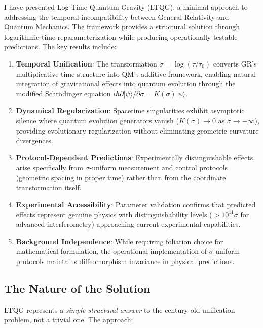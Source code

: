 \documentclass[12pt,a4paper]{article}
\begin{document}
I have presented Log-Time Quantum Gravity (LTQG), a minimal approach to addressing the temporal incompatibility between General Relativity and Quantum Mechanics. The framework provides a structural solution through logarithmic time reparameterization while producing operationally testable predictions. The key results include:

\begin{enumerate}
\item \textbf{Temporal Unification}: The transformation $\sigma = \log(\tau/\tau_0)$ converts GR's multiplicative time structure into QM's additive framework, enabling natural integration of gravitational effects into quantum evolution through the modified Schrödinger equation $i\hbar \partial|\psi\rangle/\partial\sigma = K(\sigma)|\psi\rangle$.

\item \textbf{Dynamical Regularization}: Spacetime singularities exhibit asymptotic silence where quantum evolution generators vanish ($K(\sigma) \to 0$ as $\sigma \to -\infty$), providing evolutionary regularization without eliminating geometric curvature divergences.

\item \textbf{Protocol-Dependent Predictions}: Experimentally distinguishable effects arise specifically from $\sigma$-uniform measurement and control protocols (geometric spacing in proper time) rather than from the coordinate transformation itself.

\item \textbf{Experimental Accessibility}: Parameter validation confirms that predicted effects represent genuine physics with distinguishability levels ($>10^{11}\sigma$ for advanced interferometry) approaching current experimental capabilities.

\item \textbf{Background Independence}: While requiring foliation choice for mathematical formulation, the operational implementation of $\sigma$-uniform protocols maintains diffeomorphism invariance in physical predictions.
\end{enumerate}

\subsection{The Nature of the Solution}

LTQG represents a \emph{simple structural answer} to the century-old unification problem, not a trivial one. The approach:
\end{document}
